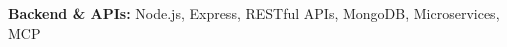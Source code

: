             \textbf{Backend \& APIs: }{Node.js, Express, RESTful APIs, MongoDB, Microservices, MCP}
